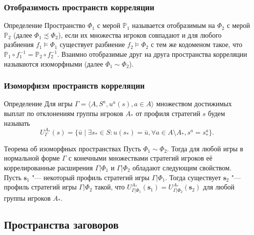 \begin{frame}
	\frametitle{Отобразимость пространств корреляции}
	\begin{block}{Определение}
		Пространство $\Phi_1$ с мерой $\mathbb{P}_1$ называется отобразимым на $\Phi_2$ с мерой $\mathbb{P}_2$ (далее $\Phi_1 \precsim \Phi_2$), если их множества игроков совпадают и для любого разбиения $f_1 \models \Phi_1$ существует разбиение $f_2 \models \Phi_2$ с тем же кодоменом такое, что $\mathbb{P}_1 \circ f_1^{-1} = \mathbb{P}_2 \circ f_2^{-1}$. Взаимно отобразимые друг на друга пространства корреляции называются изоморфными (далее $\Phi_1 \sim \Phi_2$).
	\end{block}
\end{frame}

\begin{frame}
	\frametitle{Изоморфизм пространств корреляции}
	\begin{block}{Определение}
		Для игры $\Gamma = \langle A, S^a, u^a(s), a \in A \rangle$ множеством достижимых выплат по отклонениям группы игроков $A_*$ от профиля стратегий $s$ будем называть
		\begin{equation*}
			U_\Gamma^{A_*}(s) = \{\bar{u} \mid \exists s_* \in S : u(s_*) = \bar{u}, \forall a \in A \setminus A_*, s^a = s_*^a\}.
		\end{equation*}
	\end{block}
	\begin{block}{Теорема об изоморфных пространствах}
		Пусть $\Phi_1 \sim \Phi_2$. Тогда для любой игры в нормальной форме $\Gamma$ с конечными множествами стратегий игроков её коррелированные расширения $\Gamma | \Phi_1$ и $\Gamma | \Phi_2$ обладают следующим свойством. Пусть $\mathbf{s}_1$ "--- некоторый профиль стратегий игры $\Gamma | \Phi_1$. Тогда существует $\mathbf{s}_2$ "--- профиль стратегий игры $\Gamma | \Phi_2$ такой, что $U_{\Gamma | \Phi_1}^{A_*}(\mathbf{s}_1) = U_{\Gamma | \Phi_2}^{A_*}(\mathbf{s}_2)$ для любой группы игроков $A_*$.
	\end{block}
\end{frame}

\subsection{Пространства заговоров}

